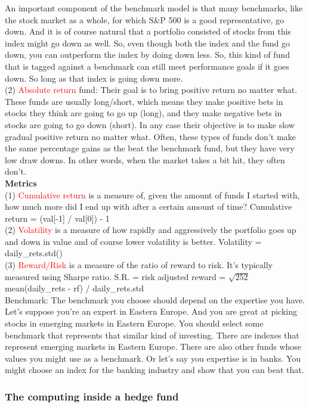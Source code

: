 \documentclass[12pt]{article}
\begin{document}
An important component of the benchmark model is that many benchmarks, like the stock market as a whole, for which S\&P 500 is a good representative, go down. And it is of course natural that a portfolio consisted of stocks from this index might go down as well. So, even though both the index and the fund go down, you can outperform the index by doing down less. So, this kind of fund that is tagged against a benchmark can still meet performance goals if it goes down. So long as that index is going down more. \\
(2) \textcolor{red}{Absolute return} fund: Their goal is to bring positive return no matter what. These funds are usually long/short, which means they make positive bets in stocks they think are going to go up (long), and they make negative bets in stocks are going to go down (short). In any case their objective is to make slow gradual positive return no matter what. Often, these types of funds don't make the same percentage gains as the beat the benchmark fund, but they have very low draw downs. In other words, when the market takes a bit hit, they often don't. \\ [5pt]
\noindent
\textbf{Metrics} \\
(1) \textcolor{red}{Cumulative return} is a measure of, given the amount of funds I started with, how much more did I end up with after a certain amount of time? Cumulative return = (val[-1] / val[0]) - 1 \\
(2) \textcolor{red}{Volatility} is a measure of how rapidly and aggressively the portfolio goes up and down in value and of course lower volatility is better. Volatility = daily\_rets.std() \\
(3) \textcolor{red}{Reward/Risk} is a measure of the ratio of reward to risk. It's typically measured using Sharpe ratio. S.R. = risk adjusted reward = $\sqrt{252}$mean(daily\_rets - rf) / daily\_rets.std \\[5pt]
\noindent
Benchmark: The benchmark you choose should depend on the expertise you have. Let's suppose you're an expert in Eastern Europe. And you are great at picking stocks in emerging markets in Eastern Europe. You should select some benchmark that represents that similar kind of investing. There are indexes that represent emerging markets in Eastern Europe. There are also other funds whose values you might use as a benchmark. Or let's say you expertise is in banks. You might choose an index for the banking industry and show that you can beat that.

\subsubsection{The computing inside a hedge fund}
\end{document}

